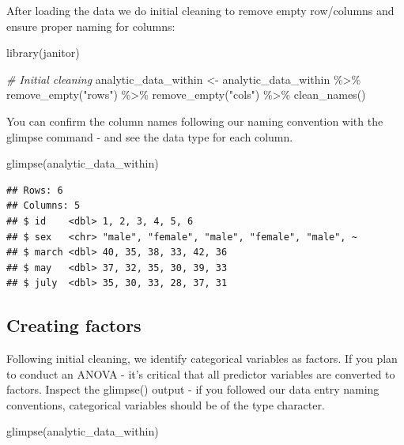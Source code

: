\documentclass[
]{krantz}
\makeatletter
\newenvironment{Shaded}{\begin{snugshade}}{\end{snugshade}}
\newcommand{\CommentTok}[1]{\textcolor[rgb]{0.37,0.37,0.37}{\textit{#1}}}
\newcommand{\FunctionTok}[1]{\textcolor[rgb]{0,0,0}{#1}}
\newcommand{\NormalTok}[1]{#1}
\newcommand{\OtherTok}[1]{\textcolor[rgb]{0.37,0.37,0.37}{#1}}
\newcommand{\SpecialCharTok}[1]{\textcolor[rgb]{0,0,0}{#1}}
\newcommand{\StringTok}[1]{\textcolor[rgb]{0.5,0.5,0.5}{#1}}
\newenvironment{kframe}{%
\medskip{}
\setlength{\fboxsep}{.8em}
 \def\at@end@of@kframe{}%
 \ifinner\ifhmode%
  \def\at@end@of@kframe{\end{minipage}}%
  \begin{minipage}{\columnwidth}%
 \fi\fi%
 \def\FrameCommand##1{\hskip\@totalleftmargin \hskip-\fboxsep
 \colorbox{shadecolor}{##1}\hskip-\fboxsep
     \hskip-\linewidth \hskip-\@totalleftmargin \hskip\columnwidth}%
 \MakeFramed {\advance\hsize-\width
   \@totalleftmargin\z@ \linewidth\hsize
   \@setminipage}}%
 {\par\unskip\endMakeFramed%
 \at@end@of@kframe}
\renewenvironment{Shaded}{\begin{kframe}}{\end{kframe}}
\makeatother
\begin{document}
After loading the data we do initial cleaning to remove empty row/columns and ensure proper naming for columns:

\begin{Shaded}
\begin{Highlighting}[]
\FunctionTok{library}\NormalTok{(janitor)}

\CommentTok{\# Initial cleaning}
\NormalTok{analytic\_data\_within }\OtherTok{\textless{}{-}}\NormalTok{ analytic\_data\_within }\SpecialCharTok{\%\textgreater{}\%}
  \FunctionTok{remove\_empty}\NormalTok{(}\StringTok{"rows"}\NormalTok{) }\SpecialCharTok{\%\textgreater{}\%}
  \FunctionTok{remove\_empty}\NormalTok{(}\StringTok{"cols"}\NormalTok{) }\SpecialCharTok{\%\textgreater{}\%}
  \FunctionTok{clean\_names}\NormalTok{()}
\end{Highlighting}
\end{Shaded}

You can confirm the column names following our naming convention with the glimpse command - and see the data type for each column.

\begin{Shaded}
\begin{Highlighting}[]
\FunctionTok{glimpse}\NormalTok{(analytic\_data\_within)}
\end{Highlighting}
\end{Shaded}

\begin{verbatim}
## Rows: 6
## Columns: 5
## $ id    <dbl> 1, 2, 3, 4, 5, 6
## $ sex   <chr> "male", "female", "male", "female", "male", ~
## $ march <dbl> 40, 35, 38, 33, 42, 36
## $ may   <dbl> 37, 32, 35, 30, 39, 33
## $ july  <dbl> 35, 30, 33, 28, 37, 31
\end{verbatim}

\hypertarget{creating-factors-1}{%
\subsection{Creating factors}\label{creating-factors-1}}

Following initial cleaning, we identify categorical variables as factors. If you plan to conduct an ANOVA - it's critical that all predictor variables are converted to factors. Inspect the glimpse() output - if you followed our data entry naming conventions, categorical variables should be of the type character.

\begin{Shaded}
\begin{Highlighting}[]
\FunctionTok{glimpse}\NormalTok{(analytic\_data\_within)}
\end{Highlighting}
\end{Shaded}
\end{document}
